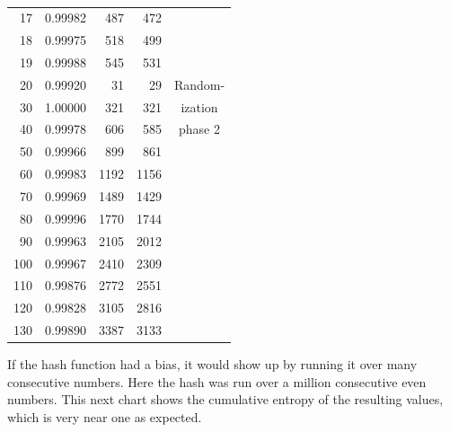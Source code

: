 \documentclass[letterpaper]{article}
\begin{document}
\begin{multicols}{2}
\begin{table}[th]
\begin{tabular}{|r|r|r|r|c|}
            17                 & 0.99982          & 487           & 472            &                  \\
            18                 & 0.99975          & 518           & 499            &                  \\
            19                 & 0.99988          & 545           & 531            &                  \\
            \hline
            20                 & 0.99920          & 31            & 29             & Random-    \\
            30                 & 1.00000          & 321           & 321            & ization          \\
            40                 & 0.99978          & 606           & 585            & phase 2                 \\
            50                 & 0.99966          & 899           & 861            &                  \\
            60                 & 0.99983          & 1192          & 1156           &                  \\
            70                 & 0.99969          & 1489          & 1429           &                  \\
            80                 & 0.99996          & 1770          & 1744           &                  \\
            90                 & 0.99963          & 2105          & 2012           &                  \\
            100                & 0.99967          & 2410          & 2309           &                  \\
            110                & 0.99876          & 2772          & 2551           &                  \\
            120                & 0.99828          & 3105          & 2816           &                  \\
            130                & 0.99890          & 3387          & 3133           &                  \\
            \hline
        \end{tabular}
        \caption{}
    \end{table}

    If the hash function had a bias, it would show up by running it over many consecutive numbers. Here the hash was run over a million consecutive even numbers. This next chart shows the cumulative entropy of the resulting values, which is very near one as expected.


\end{multicols}
\end{document}
